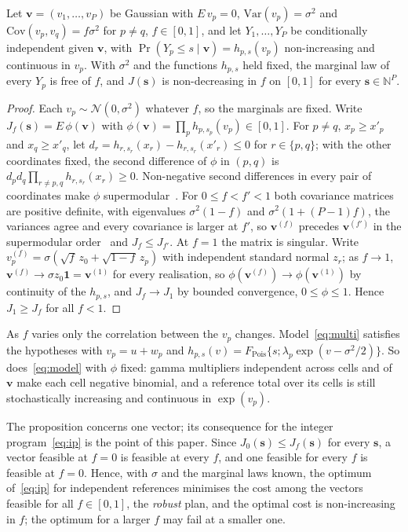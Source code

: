 \begin{proposition}
\label{prop:mono}
Let $\mathbf v=(v_1,\dots,v_P)$ be Gaussian with $E\,v_p=0$,
$\mathrm{Var}(v_p)=\sigma^2$ and $\mathrm{Cov}(v_p,v_q)=f\sigma^2$ for $p\ne q$,
$f\in[0,1]$, and let $Y_1,\dots,Y_P$ be conditionally independent given
$\mathbf v$, with $\Pr(Y_p\le s\mid\mathbf v)=h_{p,s}(v_p)$ non-increasing and
continuous in $v_p$. With $\sigma^2$ and the functions $h_{p,s}$ held fixed,
the marginal law of every $Y_p$ is free of $f$, and $J(\mathbf s)$ is
non-decreasing in $f$ on $[0,1]$ for every $\mathbf s\in\mathbb N^P$.
\end{proposition}
\begin{proof}
Each $v_p\sim\mathcal N(0,\sigma^2)$ whatever $f$, so the marginals are fixed.
Write $J_f(\mathbf s)=E\,\phi(\mathbf v)$ with
$\phi(\mathbf v)=\prod_p h_{p,s_p}(v_p)\in[0,1]$. For $p\ne q$, $x_p\ge x'_p$
and $x_q\ge x'_q$, let $d_r=h_{r,s_r}(x_r)-h_{r,s_r}(x'_r)\le0$ for
$r\in\{p,q\}$; with the other coordinates fixed, the second difference of
$\phi$ in $(p,q)$ is $d_pd_q\prod_{r\ne p,q}h_{r,s_r}(x_r)\ge0$.
Non-negative second differences in every pair of coordinates make $\phi$
supermodular~\cite{muller2000}. For $0\le f<f'<1$ both covariance matrices are
positive definite, with eigenvalues $\sigma^2(1-f)$ and
$\sigma^2(1+(P-1)f)$, the variances agree and every covariance is larger at
$f'$, so $\mathbf v^{(f)}$ precedes $\mathbf v^{(f')}$ in the supermodular
order~\cite{muller2000} and $J_f\le J_{f'}$. At $f=1$ the matrix is singular.
Write $v^{(f)}_p=\sigma(\sqrt f\,z_0+\sqrt{1-f}\,z_p)$ with independent
standard normal $z_r$; as $f\to1$, $\mathbf v^{(f)}\to\sigma z_0\mathbf 1=
\mathbf v^{(1)}$ for every realisation, so $\phi(\mathbf v^{(f)})\to
\phi(\mathbf v^{(1)})$ by continuity of the $h_{p,s}$, and $J_f\to J_1$ by
bounded convergence, $0\le\phi\le1$. Hence $J_1\ge J_f$ for all $f<1$.
\end{proof}

As $f$ varies only the correlation between the $v_p$ changes.
Model~\eqref{eq:multi} satisfies the hypotheses with $v_p=u+w_p$ and
$h_{p,s}(v)=F_{\mathrm{Pois}}\{s;\lambda_p\exp(v-\sigma^2/2)\}$. So
does~\eqref{eq:model} with $\phi$ fixed: gamma multipliers independent across
cells and of $\mathbf v$ make each cell negative binomial, and a reference
total over its cells is still stochastically increasing and continuous in
$\exp(v_p)$.

The proposition concerns one vector; its consequence for the integer
program~\eqref{eq:ip} is the point of this paper. Since $J_0(\mathbf s)\le
J_f(\mathbf s)$ for every $\mathbf s$, a vector feasible at $f=0$ is feasible
at every $f$, and one feasible for every $f$ is feasible at $f=0$. Hence, with
$\sigma$ and the marginal laws known, the optimum of~\eqref{eq:ip} for
independent references minimises the cost among the vectors feasible for all
$f\in[0,1]$, the \emph{robust} plan, and the optimal cost is non-increasing in
$f$; the optimum for a larger $f$ may fail at a smaller one.

